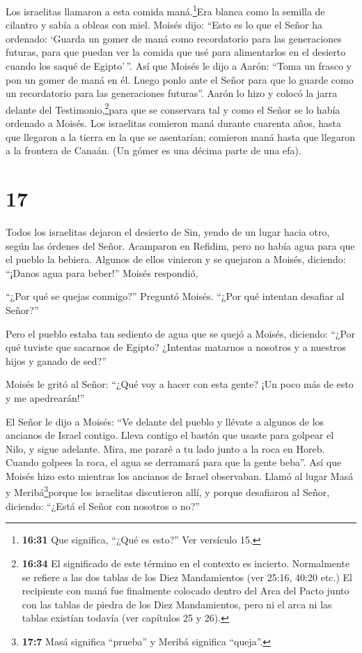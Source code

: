  Los israelitas llamaron a esta comida maná.\footnote{\textbf{16:31}
  Que significa, ``¿Qué es esto?'' Ver versículo 15.}Era blanca como la
semilla de cilantro y sabía a obleas con miel.  Moisés
dijo: ``Esto es lo que el Señor ha ordenado: `Guarda un gomer de maná
como recordatorio para las generaciones futuras, para que puedan ver la
comida que usé para alimentarlos en el desierto cuando los saqué de
Egipto'\,''.  Así que Moisés le dijo a Aarón: ``Toma un
frasco y pon un gomer de maná en él. Luego ponlo ante el Señor para que
lo guarde como un recordatorio para las generaciones futuras''.
 Aarón lo hizo y colocó la jarra delante del
Testimonio,\footnote{\textbf{16:34} El significado de este término en el
  contexto es incierto. Normalmente se refiere a las dos tablas de los
  Diez Mandamientos (ver 25:16, 40:20 etc.) El recipiente con maná fue
  finalmente colocado dentro del Arca del Pacto junto con las tablas de
  piedra de los Diez Mandamientos, pero ni el arca ni las tablas
  existían todavía (ver capítulos 25 y 26).}para que se conservara tal y
como el Señor se lo había ordenado a Moisés.  Los
israelitas comieron maná durante cuarenta años, hasta que llegaron a la
tierra en la que se asentarían; comieron maná hasta que llegaron a la
frontera de Canaán.  (Un gómer es una décima parte de una
efa).

\hypertarget{section-16}{%
\section{17}\label{section-16}}

 Todos los israelitas dejaron el desierto de Sin, yendo de
un lugar hacia otro, según las órdenes del Señor. Acamparon en Refidim,
pero no había agua para que el pueblo la bebiera.  Algunos
de ellos vinieron y se quejaron a Moisés, diciendo: ``¡Danos agua para
beber!'' Moisés respondió,

``¿Por qué se quejas conmigo?'' Preguntó Moisés. ``¿Por qué intentan
desafiar al Señor?''

 Pero el pueblo estaba tan sediento de agua que se quejó a
Moisés, diciendo: ``¿Por qué tuviste que sacarnos de Egipto? ¿Intentas
matarnos a nosotros y a nuestros hijos y ganado de sed?''

 Moisés le gritó al Señor: ``¿Qué voy a hacer con esta
gente? ¡Un poco más de esto y me apedrearán!''

 El Señor le dijo a Moisés: ``Ve delante del pueblo y
llévate a algunos de los ancianos de Israel contigo. Lleva contigo el
bastón que usaste para golpear el Nilo, y sigue adelante. 
Mira, me pararé a tu lado junto a la roca en Horeb. Cuando golpees la
roca, el agua se derramará para que la gente beba''. Así que Moisés hizo
esto mientras los ancianos de Israel observaban.  Llamó al
lugar Masá y Meribá\footnote{\textbf{17:7} Masá significa ``prueba'' y
  Meribá significa ``queja''.}porque los israelitas discutieron allí, y
porque desafiaron al Señor, diciendo: ``¿Está el Señor con nosotros o
no?''

